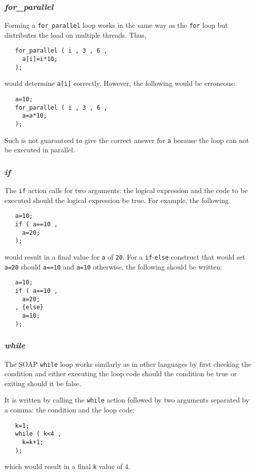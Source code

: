 \documentclass{warpdoc}
\begin{document}
\subsubsection{\emph{for\_parallel}}

Forming a \verb|for_parallel| loop works in the same way as the \verb|for| loop but distributes
the load on multiple threads. Thus,
%
\begin{verbatim}
   for_parallel ( i , 3 , 6 ,
     a[i]=i*10;
   );
\end{verbatim}
%
would determine \verb|a[i]| correctly. However, the following would be erroneous:
%
\begin{verbatim}
   a=10;
   for_parallel ( i , 3 , 6 ,
     a=a*10;
   );
\end{verbatim}
%
Such is not guaranteed to give the correct answer for \verb|a| because the loop can not be executed in parallel. 

\subsubsection{\emph{if}}

The \verb|if| action  calls for
two arguments: the logical expression and the code to
be executed should the logical expression be true.
For example, the following
%
\begin{verbatim}
   a=10;
   if ( a==10 ,
     a=20;
   );
\end{verbatim}
%
would result in a final value for \verb|a| of \verb|20|. For a \verb|if|-\verb|else| construct that would set \verb|a=20| should \verb|a==10| and \verb|a=10| otherwise, the following should be written:
%
\begin{verbatim}
   a=10;
   if ( a==10 ,
     a=20;
   , {else}
     a=10;
   );
\end{verbatim}
%


\subsubsection{\emph{while}}

The SOAP \verb|while| loop works similarly as in other languages
by first checking the condition and
either executing the loop code should the condition be true or exiting
should it be false.

It is written by calling the \verb|while| action followed by
two arguments separated by a comma: the condition and the loop code:
%
\begin{verbatim}
   k=1;
   while ( k<4 ,
     k=k+1;
   );
\end{verbatim}
%
which would result in a final \verb|k| value of 4.
\end{document}

